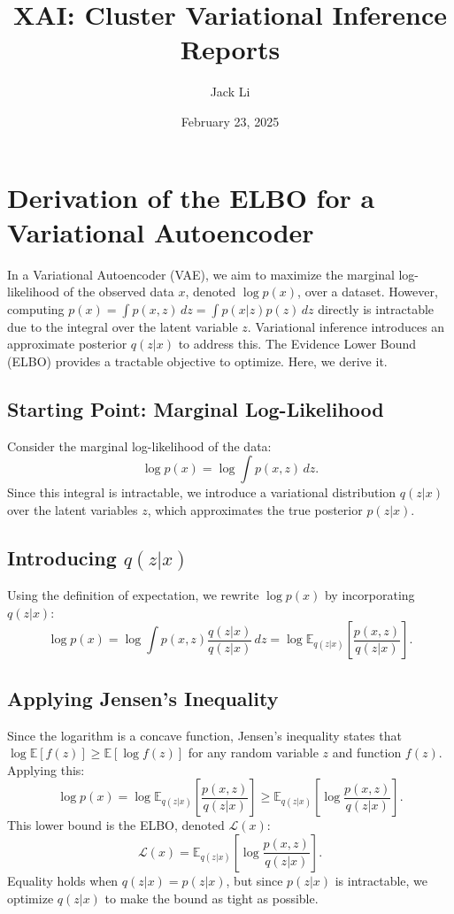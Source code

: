 \documentclass[12pt]{article}
\title{XAI: Cluster Variational Inference Reports}
\author{Jack Li}
\date{February 23, 2025}
\numberwithin{equation}{section}
\begin{document}
\onehalfspacing  %

\maketitle

\section{Derivation of the ELBO for a Variational Autoencoder}

In a Variational Autoencoder (VAE), we aim to maximize the marginal log-likelihood of the observed data \( x \), denoted \( \log p(x) \), over a dataset. However, computing \( p(x) = \int p(x, z) \, dz = \int p(x | z) p(z) \, dz \) directly is intractable due to the integral over the latent variable \( z \). Variational inference introduces an approximate posterior \( q(z | x) \) to address this. The Evidence Lower Bound (ELBO) provides a tractable objective to optimize. Here, we derive it.

\subsection{Starting Point: Marginal Log-Likelihood}
Consider the marginal log-likelihood of the data:
\begin{equation}
\log p(x) = \log \int p(x, z) \, dz.
\label{eq:marginal_log_likelihood}
\end{equation}
Since this integral is intractable, we introduce a variational distribution \( q(z | x) \) over the latent variables \( z \), which approximates the true posterior \( p(z | x) \).

\subsection{Introducing \( q(z | x) \)}
Using the definition of expectation, we rewrite \( \log p(x) \) by incorporating \( q(z | x) \):
\begin{equation}
\log p(x) = \log \int p(x, z) \frac{q(z | x)}{q(z | x)} \, dz = \log \mathbb{E}_{q(z | x)} \left[ \frac{p(x, z)}{q(z | x)} \right].
\label{eq:expectation}
\end{equation}

\subsection{Applying Jensen's Inequality}
Since the logarithm is a concave function, Jensen's inequality states that \( \log \mathbb{E}[f(z)] \geq \mathbb{E}[\log f(z)] \) for any random variable \( z \) and function \( f(z) \). Applying this:
\[
\log p(x) = \log \mathbb{E}_{q(z | x)} \left[ \frac{p(x, z)}{q(z | x)} \right] \geq \mathbb{E}_{q(z | x)} \left[ \log \frac{p(x, z)}{q(z | x)} \right].
\]
This lower bound is the ELBO, denoted \( \mathcal{L}(x) \):
\begin{equation}
\mathcal{L}(x) = \mathbb{E}_{q(z | x)} \left[ \log \frac{p(x, z)}{q(z | x)} \right].
\label{eq:elbo}
\end{equation}
Equality holds when \( q(z | x) = p(z | x) \), but since \( p(z | x) \) is intractable, we optimize \( q(z | x) \) to make the bound as tight as possible.
\end{document}
